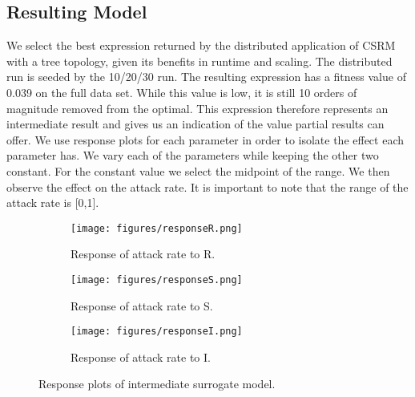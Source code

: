 
\subsection{Resulting Model}
We select the best expression returned by the distributed application of CSRM with a tree topology, given its benefits in runtime and scaling. The distributed run is seeded by the 10/20/30 run. The resulting expression has a fitness value of 0.039 on the full data set. While this value is low, it is still 10 orders of magnitude removed from the optimal. This expression therefore represents an intermediate result and gives us an indication of the value partial results can offer.
We use response plots for each parameter in order to isolate the effect each parameter has. We vary each of the parameters while keeping the other two constant. For the constant value we select the midpoint of the range. We then observe the effect on the attack rate. It is important to note that the range of the attack rate is [0,1]. 
\begin{figure*}
    \begin{subfigure}{0.9\textwidth}
        \texttt{[image: figures/responseR.png]}
        \caption{Response of attack rate to R.}
    \end{subfigure}
    \begin{subfigure}{0.9\textwidth}
        \texttt{[image: figures/responseS.png]}
        \caption{Response of attack rate to S.}
    \end{subfigure}
        \begin{subfigure}{0.9\textwidth}
        \texttt{[image: figures/responseI.png]}
        \caption{Response of attack rate to I.}
    \end{subfigure}
    \caption{Response plots of intermediate surrogate model.}
    \label{fig:usecaseresponseplots}
\end{figure*}
